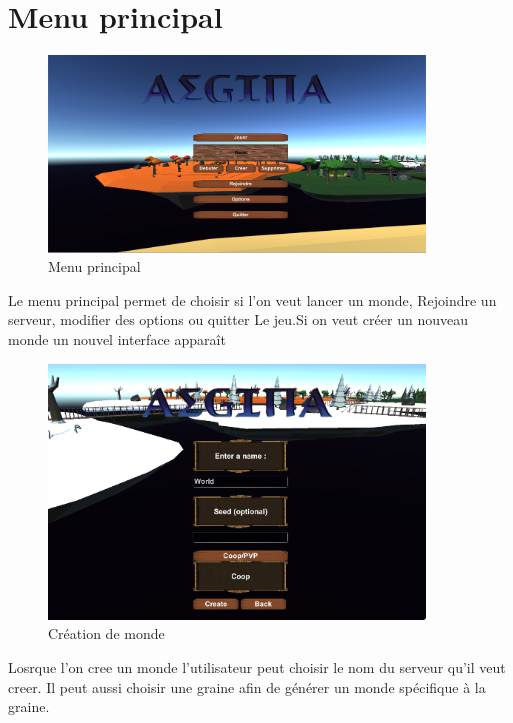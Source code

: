 \documentclass[12pt,a4paper]{article}
\begin{document}
\pagebreak

\section{Menu principal}

\begin{figure}[h!]
\begin{center}\includegraphics[width=10cm]{res/MenuPrincipal} %
\caption{Menu principal} 
\end{center}
\end{figure}

Le menu principal permet de choisir si l'on veut lancer un monde, Rejoindre un serveur, modifier des options ou quitter Le jeu.Si on veut créer un nouveau monde un nouvel interface apparaît

\begin{figure}[h!]
\begin{center}\includegraphics[width=10cm]{res/CreationMonde} %
\caption{Création de monde} 
\end{center}
\end{figure}

Losrque l'on cree un monde l'utilisateur peut choisir le nom du serveur qu'il veut creer. Il peut aussi choisir une graine afin de générer un monde spécifique à la graine. 
\end{document}
